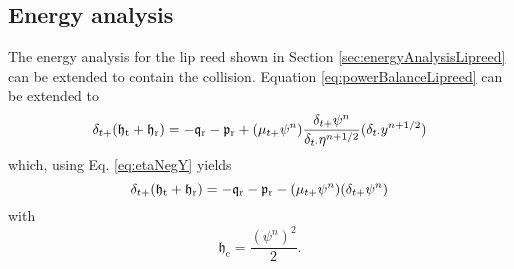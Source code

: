 \subsection{Energy analysis}
The energy analysis for the lip reed shown in Section \ref{sec:energyAnalysisLipreed} can be extended to contain the collision. Equation \eqref{eq:powerBalanceLipreed} can be extended to
\begin{equation*}
    \delta_{t+}(\mathfrak{h}_\text{t}+\mathfrak{h}_\text{r}) = - \mathfrak{q}_\text{r} - \mathfrak{p}_\text{r}+(\mu_{t+}\psi^n) \frac{\delta_{t+}\psi^n}{\delta_{t\cdot}\eta^{n+1/2}}(\delta_{t\cdot}y^{n+1/2})
\end{equation*}
which, using Eq. \eqref{eq:etaNegY} yields
\begin{equation*}
    \delta_{t+}(\mathfrak{h}_\text{t}+\mathfrak{h}_\text{r}) = - \mathfrak{q}_\text{r} - \mathfrak{p}_\text{r}-(\mu_{t+}\psi^n) (\delta_{t+}\psi^n)
\end{equation*}
with
\begin{equation*}
    \mathfrak{h}_\text{c} = \frac{(\psi^n)^2}{2}.
\end{equation*}




